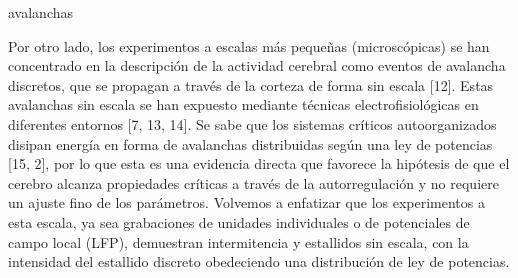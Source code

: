 avalanchas 

Por otro lado, los experimentos a escalas más pequeñas (microscópicas) se han concentrado en la descripción de la actividad cerebral como eventos de avalancha discretos, que se propagan a través de la corteza de forma sin escala [12]. Estas avalanchas sin escala se han expuesto mediante técnicas electrofisiológicas en diferentes entornos [7, 13, 14]. Se sabe que los sistemas críticos autoorganizados disipan energía en forma de avalanchas distribuidas según una ley de potencias [15, 2], por lo que esta es una evidencia directa que favorece la hipótesis de que el cerebro alcanza propiedades críticas a través de la autorregulación y no requiere un ajuste fino de los parámetros. Volvemos a enfatizar que los experimentos a esta escala, ya sea grabaciones de unidades individuales o de potenciales de campo local (LFP), demuestran intermitencia y estallidos sin escala, con la intensidad del estallido discreto obedeciendo una distribución de ley de potencias.



